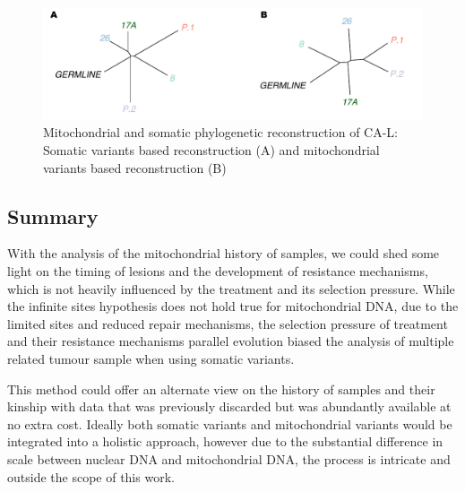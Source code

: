 \begin{figure}[ht]
\centering
\includegraphics[width=.99\linewidth]{Figures/CASCADE/mito/CA86SomVsMitoPhylo.pdf}
\caption[Mitochondrial and somatic phylogenetic reconstruction of CA-L]{Mitochondrial and somatic phylogenetic reconstruction of CA-L: Somatic variants based reconstruction (A) and mitochondrial variants based reconstruction (B)} \label{fig:CA86mitoPhylo}
\end{figure}

\subsection{Summary}
With the analysis of the mitochondrial history of samples, we could shed some light on the timing of lesions and the development of resistance mechanisms, which is not heavily influenced by the treatment and its selection pressure. While the infinite sites hypothesis does not hold true for mitochondrial DNA, due to the limited sites and reduced repair mechanisms, the selection pressure of treatment and their resistance mechanisms parallel evolution biased the analysis of multiple related tumour sample when using somatic variants.

This method could offer an alternate view on the history of samples and their kinship with data that was previously discarded but was abundantly available at no extra cost. Ideally both somatic variants and mitochondrial variants would be integrated into a holistic approach, however due to the substantial difference in scale between nuclear DNA and mitochondrial DNA, the process is intricate and outside the scope of this work.